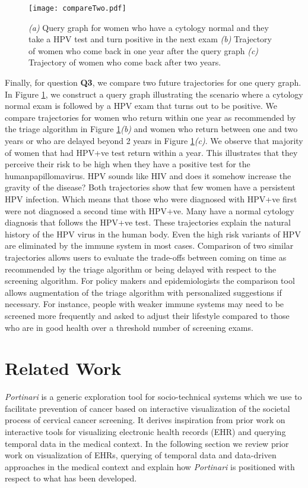 \documentclass[10pt, conference]{IEEEtran}
\begin{document}
\begin{figure}[t]
\texttt{[image: compareTwo.pdf]}
\caption{\textit{(a)} Query graph for women who have a cytology normal and they take a HPV test and turn positive in the next exam \textit{(b)} Trajectory of women who come back in one year after the query graph \textit{(c)} Trajectory of women who come back after two years. }
\label{fig:compareTwo}
\end{figure}

Finally, for question \textbf{Q3}, we compare two future trajectories for one query graph. In Figure \ref{fig:compareTwo}, we construct a query graph illustrating the scenario where a cytology normal exam is  followed by a HPV exam that turns out to be positive. We compare trajectories for women who return within one year as recommended by the triage algorithm in Figure \ref{fig:compareTwo}\textit{(b)} and women who return between one and two years or who are delayed beyond 2 years in Figure \ref{fig:compareTwo}\textit{(c)}. We observe that majority of women that had HPV+ve test return within a year. This illustrates that they perceive their risk to be high when they have a positive test for the humanpapillomavirus. HPV sounds like HIV and does it somehow increase the gravity of the disease? Both trajectories show that few women have a persistent HPV infection. Which means that those who were diagnosed with HPV+ve first were not diagnosed a second time with HPV+ve. Many have a normal cytology diagnosis that follows the HPV+ve test. These trajectories explain the natural history of the HPV virus in the human body. Even the high risk variants of HPV  are  eliminated by the immune system in most cases. 
Comparison of two similar trajectories allows users to evaluate the trade-offs between coming on time as recommended by the triage algorithm or being delayed with respect to the screening algorithm. For policy makers and epidemiologists the comparison tool allows augmentation of the triage algorithm with personalized suggestions if necessary. For instance, people with weaker immune systems may need to be screened more frequently and asked to adjust their lifestyle  compared to those who are in good health over a threshold number of screening exams.

\section{Related Work}
\label{sec:related}
\textit{Portinari} is a generic exploration tool for socio-technical systems which we use to facilitate prevention of cancer based on interactive visualization of the societal process of cervical cancer screening. It derives inspiration from prior work on interactive tools for visualizing electronic health records (EHR) and querying temporal data in the medical context.   In the following section we review prior work on visualization of EHRs, querying of temporal data and data-driven approaches in the medical context and explain how \textit{Portinari} is positioned with respect to what has been developed. 
\end{document}
